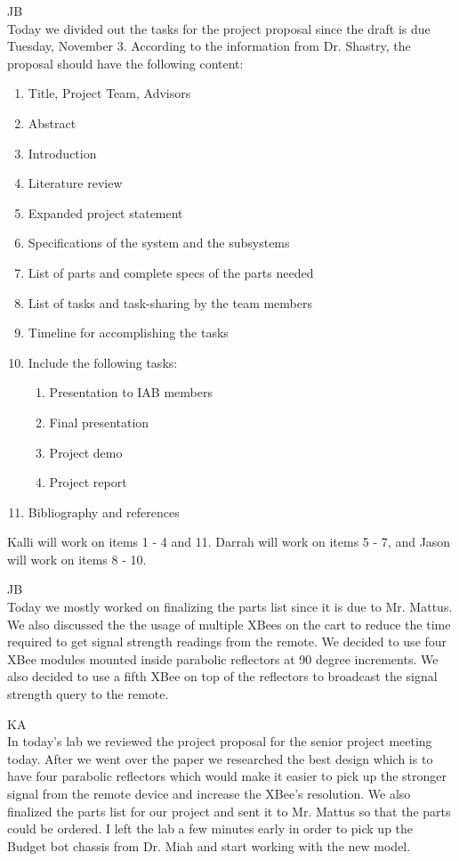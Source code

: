 \documentclass[fontsize=11pt, %
                             paper=letter, %
                             openany, %
                             captions=tableheading,
                             index=totoc,
                             hyperref]{labbook}
\begin{document}
\begin{addmargin}[0cm]{0cm}
JB\\
Today we divided out the tasks for the project proposal since the draft is due Tuesday, November 3. According to the information from Dr. Shastry, the proposal should have the following content:
\begin{enumerate}
    \item Title, Project Team, Advisors
    \item Abstract
    \item Introduction
    \item Literature review
    \item Expanded project statement
    \item Specifications of the system and the subsystems
    \item List of parts and complete specs of the parts needed
    \item List of tasks and task-sharing by the team members
    \item Timeline for accomplishing the tasks
    \item Include the following tasks:
    \begin{enumerate}
        \item Presentation to IAB members
        \item Final presentation
        \item Project demo
        \item Project report
    \end{enumerate}
    \item Bibliography and references
\end{enumerate}

Kalli will work on items 1 - 4 and 11. Darrah will work on items 5 - 7, and Jason will work on items 8 - 10.



JB\\
Today we mostly worked on finalizing the parts list since it is due to Mr. Mattus. We also discussed the the usage of multiple XBees on the cart to reduce the time required to get signal strength readings from the remote. We decided to use four XBee modules mounted inside parabolic reflectors at 90 degree increments. We also decided to use a fifth XBee on top of the reflectors to broadcast the signal strength query to the remote.

\vspace*{12pt}
KA\\
In today's lab we reviewed the project proposal for the senior project meeting today. After we went over the paper we researched the best design which is to have four parabolic reflectors which would make it easier to pick up the stronger signal from the remote device and increase the XBee's resolution. We also finalized the parts list for our project and sent it to Mr. Mattus so that the parts could be ordered. I left the lab a few minutes early in order to pick up the Budget bot chassis from Dr. Miah and start working with the new model.


\end{addmargin}
\end{document}
